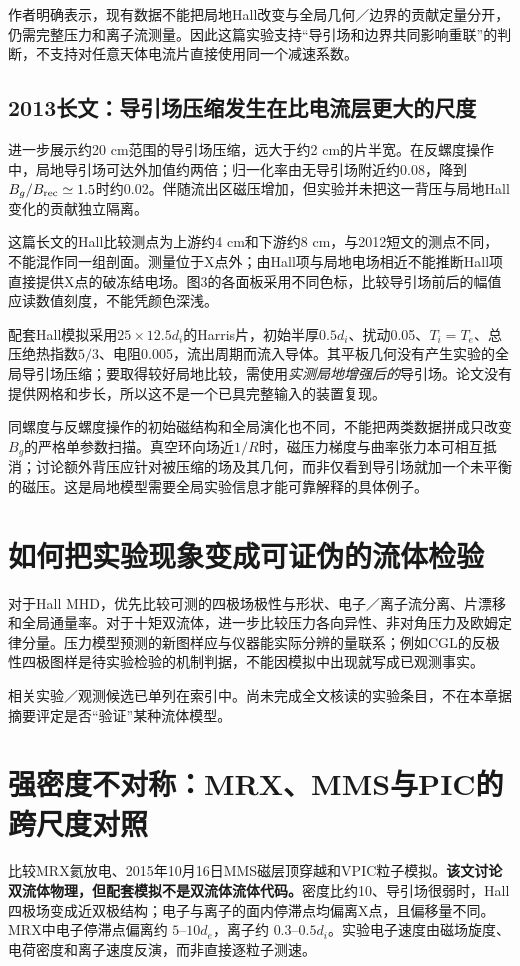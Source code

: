 \documentclass[UTF8,a4paper,11pt,openany,fontset=fandol]{ctexbook}
\begin{document}
作者明确表示，现有数据不能把局地Hall改变与全局几何／边界的贡献定量分开，仍需完整压力和离子流测量。因此这篇实验支持“导引场和边界共同影响重联”的判断，不支持对任意天体电流片直接使用同一个减速系数。

\subsection{2013长文：导引场压缩发生在比电流层更大的尺度}
\citet{L193}进一步展示约20 cm范围的导引场压缩，远大于约2 cm的片半宽。在反螺度操作中，局地导引场可达外加值约两倍；归一化率由无导引场附近约0.08，降到$B_g/B_{\rm rec}\simeq1.5$时约0.02。伴随流出区磁压增加，但实验并未把这一背压与局地Hall变化的贡献独立隔离。

这篇长文的Hall比较测点为上游约4 cm和下游约8 cm，与2012短文的测点不同，不能混作同一组剖面。测量位于X点外；由Hall项与局地电场相近不能推断Hall项直接提供X点的破冻结电场。图3的各面板采用不同色标，比较导引场前后的幅值应读数值刻度，不能凭颜色深浅。

配套Hall模拟采用$25\times12.5d_i$的Harris片，初始半厚$0.5d_i$、扰动0.05、$T_i=T_e$、总压绝热指数$5/3$、电阻0.005，流出周期而流入导体。其平板几何没有产生实验的全局导引场压缩；要取得较好局地比较，需使用\emph{实测局地增强后的}导引场。论文没有提供网格和步长，所以这不是一个已具完整输入的装置复现。

同螺度与反螺度操作的初始磁结构和全局演化也不同，不能把两类数据拼成只改变$B_g$的严格单参数扫描。真空环向场近$1/R$时，磁压力梯度与曲率张力本可相互抵消；讨论额外背压应针对被压缩的场及其几何，而非仅看到导引场就加一个未平衡的磁压。这是局地模型需要全局实验信息才能可靠解释的具体例子。

\section{如何把实验现象变成可证伪的流体检验}
对于Hall MHD，优先比较可测的四极场极性与形状、电子／离子流分离、片漂移和全局通量率。对于十矩双流体，进一步比较压力各向异性、非对角压力及欧姆定律分量。压力模型预测的新图样应与仪器能实际分辨的量联系；例如CGL的反极性四极图样是待实验检验的机制判据，不能因模拟中出现就写成已观测事实。\citep{Cassak2015}

相关实验／观测候选已单列在索引中。尚未完成全文核读的实验条目，不在本章据摘要评定是否“验证”某种流体模型。

\section{强密度不对称：MRX、MMS与PIC的跨尺度对照}
\citet{Yamada2018}比较MRX氦放电、2015年10月16日MMS磁层顶穿越和VPIC粒子模拟。\textbf{该文讨论双流体物理，但配套模拟不是双流体流体代码。}密度比约10、导引场很弱时，Hall四极场变成近双极结构；电子与离子的面内停滞点均偏离X点，且偏移量不同。MRX中电子停滞点偏离约 $5$--$10d_e$，离子约 $0.3$--$0.5d_i$。实验电子速度由磁场旋度、电荷密度和离子速度反演，而非直接逐粒子测速。
\end{document}
